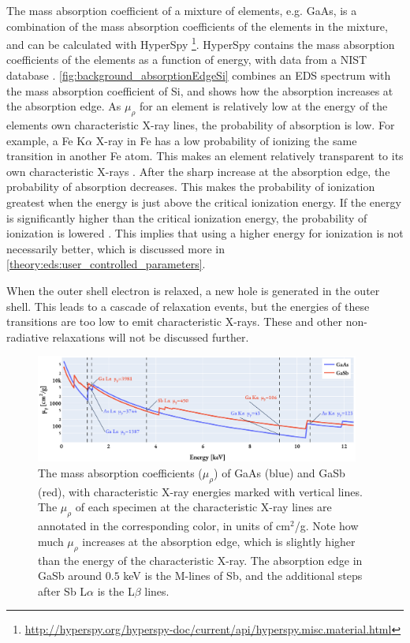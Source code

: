 The mass absorption coefficient of a mixture of elements, e.g. GaAs, is a combination of the mass absorption coefficients of the elements in the mixture, and can be calculated with HyperSpy \cite{hyperspy_1.7.1}\footnote{\url{http://hyperspy.org/hyperspy-doc/current/api/hyperspy.misc.material.html}}.
HyperSpy contains the mass absorption coefficients of the elements as a function of energy, with data from a NIST database \cite{nist_xraydatabase_hyperspy}.
\cref{fig:background_absorptionEdgeSi} combines an EDS spectrum with the mass absorption coefficient of Si, and shows how the absorption increases at the absorption edge.
As $\mu_\rho$ for an element is relatively low at the energy of the elements own characteristic X-ray lines, the probability of absorption is low.
For example, a Fe K$\alpha$ X-ray in Fe has a low probability of ionizing the same transition in another Fe atom.
This makes an element relatively transparent to its own characteristic X-rays \cite[Ch. 4.4]{goldstein_scanning_2018}.
After the sharp increase at the absorption edge, the probability of absorption decreases.
This makes the probability of ionization greatest when the energy is just above the critical ionization energy.
If the energy is significantly higher than the critical ionization energy, the probability of ionization is lowered \cite[p. 78]{curry_radiology_k_absorption}. %
This implies that using a higher energy for ionization is not necessarily better, which is discussed more in \cref{theory:eds:user_controlled_parameters}.


When the outer shell electron is relaxed, a new hole is generated in the outer shell.
This leads to a cascade of relaxation events, but the energies of these transitions are too low to emit characteristic X-rays.
These and other non-radiative relaxations will not be discussed further.


\begin{figure}[phtb]
    \centering
    \includegraphics[width=0.95\textwidth]{figures/mass_absorption_coefficients.pdf}
    \caption{
        The mass absorption coefficients ($\mu_\rho$) of GaAs (blue) and GaSb (red), with characteristic X-ray energies marked with vertical lines.
        The $\mu_\rho$ of each specimen at the characteristic X-ray lines are annotated in the corresponding color, in units of cm$^2$/g.
        Note how much $\mu_\rho$ increases at the absorption edge, which is slightly higher than the energy of the characteristic X-ray.
        The absorption edge in GaSb around $0.5$ keV is the M-lines of Sb, and the additional steps after Sb L$\alpha$ is the L$\beta$ lines.
    }
    \label{fig:mass_absorption_coefficients}
\end{figure}


